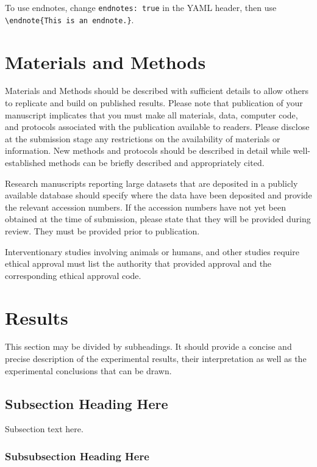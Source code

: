 \documentclass[atmosphere,article,submit,moreauthors,pdftex]{Definitions/mdpi}
\begin{document}
To use endnotes, change \texttt{endnotes:\ true} in the YAML header,
then use \texttt{\textbackslash{}endnote\{This\ is\ an\ endnote.\}}.

\section{Materials and Methods}\label{materials-and-methods-1}

Materials and Methods should be described with sufficient details to
allow others to replicate and build on published results. Please note
that publication of your manuscript implicates that you must make all
materials, data, computer code, and protocols associated with the
publication available to readers. Please disclose at the submission
stage any restrictions on the availability of materials or information.
New methods and protocols should be described in detail while
well-established methods can be briefly described and appropriately
cited.

Research manuscripts reporting large datasets that are deposited in a
publicly available database should specify where the data have been
deposited and provide the relevant accession numbers. If the accession
numbers have not yet been obtained at the time of submission, please
state that they will be provided during review. They must be provided
prior to publication.

Interventionary studies involving animals or humans, and other studies
require ethical approval must list the authority that provided approval
and the corresponding ethical approval code.

\section{Results}\label{results-1}

This section may be divided by subheadings. It should provide a concise
and precise description of the experimental results, their
interpretation as well as the experimental conclusions that can be
drawn.

\subsection{Subsection Heading Here}\label{subsection-heading-here}

Subsection text here.

\subsubsection{Subsubsection Heading
Here}\label{subsubsection-heading-here}
\end{document}
